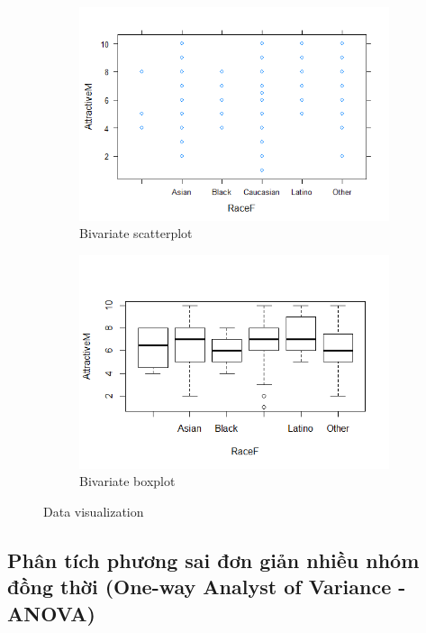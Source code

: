 \documentclass[a4paper,12pt]{article}
\begin{document}
	\begin{figure}[H]
		\centering
		\begin{subfigure}[b]{0.4\linewidth}
			\includegraphics[width=\linewidth]{xyplot}
			\caption{Bivariate scatterplot}
		\end{subfigure}
		\hfill
		\begin{subfigure}[b]{0.4\linewidth}
			\includegraphics[width=\linewidth]{boxplot}
			\caption{Bivariate boxplot}
		\end{subfigure}
		\caption{Data visualization}
		\label{fig:plot}
	\end{figure}
	
	\subsection{Phân tích phương sai đơn giản nhiều nhóm đồng thời (One-way Analyst of Variance - ANOVA)}
	
\end{document}
